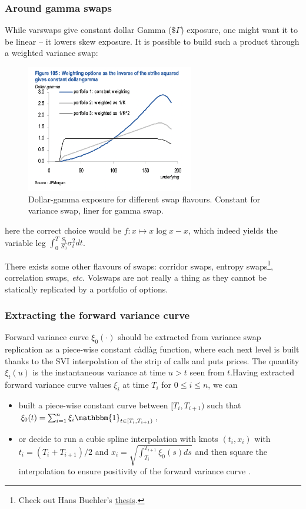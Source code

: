 \subsubsection*{Around gamma swaps}

While varswaps give constant dollar Gamma ($\$\Gamma$) exposure, one might want it to be linear -- it lowers skew exposure. It is possible to build such a product through a weighted variance swap:

\begin{figure}[H]
    \includegraphics[width=0.65\textwidth]{include/img/jpm_varswap_gamma.png}
    \centering
    \caption{Dollar-gamma exposure for different swap flavours. Constant for variance swap, liner for gamma swap.}
    \label{fig:bivariate_contour}
\end{figure}

here the correct choice would be $f: x \mapsto x\log x - x$, which indeed yields the variable leg $\int_{0}^{T} \frac{S_t}{S_0} \sigma_t^2 dt$.

There exists some other flavours of swaps: corridor swaps, entropy swaps\footnote{Check out Hans Buehler's \href{https://papers.ssrn.com/sol3/papers.cfm?abstract_id=1118245}{thesis}.}, correlation swaps, \textit{etc.} Volswaps are not really a thing as they cannot be statically replicated by a portfolio of options.

\subsubsection*{Extracting the forward variance curve}

Forward variance curve $\xi_0(\cdot)$ should be extracted from variance swap replication as a piece-wise constant c\`adl\`ag function, where each next level is built thanks to the SVI interpolation of the strip of calls and puts prices. The quantity $\xi_t(u)$ is the instantaneous variance at time $u > t$ seen from $t$.\newline Having extracted forward variance curve values $\xi_i$ at time $T_i$ for ${0\leq i \leq n}$, we can 
\begin{itemize}
    \item built a piece-wise constant curve between $[T_i, T_{i+1})$ such that $\xi_0(t) = \sum_{i=1}^n \xi_i \mathbbm{1}_{t \in [T_i, T_{i+1})}$, 
    \item or decide to run a cubic spline interpolation with knots $(t_i, x_i)$ with $t_i = (T_i + T_{i+1})/2$ and $x_i = \sqrt{\int_{T_i}^{T_{i+1}} \xi_0(s)ds}$ and then square the interpolation to ensure positivity of the forward variance curve \cite{jaber2022quintic}.
\end{itemize}